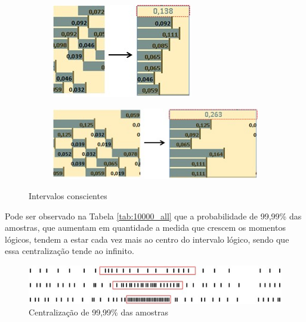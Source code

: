 \begin{figure}[H]
\centering
	\begin{subfigure}[H]{.8\linewidth}
	\centering
	\includegraphics[width=.6\linewidth]{sections/images/first_consciousness.jpg}
	\caption{}
	\label{fig:first_consciousness}
	\end{subfigure}
	\begin{subfigure}[H]{.8\linewidth}
	\centering
	\includegraphics[width=1\linewidth]{sections/images/second_consciousness.jpg}
	\caption{}
	\label{fig:second_consciousness}
	\end{subfigure}%
\caption{Intervalos conscientes}

\end{figure}

Pode ser observado na Tabela \ref{tab:10000_all} que a probabilidade de 99,99\% das amostras, que aumentam em quantidade a medida que crescem os momentos lógicos, tendem a estar cada vez mais ao centro do intervalo lógico, sendo que essa centralização tende ao infinito.

\begin{figure}[H]
\caption{Centralização de 99,99\% das amostras}
\label{fig:centering_of_99_range}
\centering
\includegraphics[scale=1]{sections/images/centering_of_99_range.jpg}
\end{figure}

